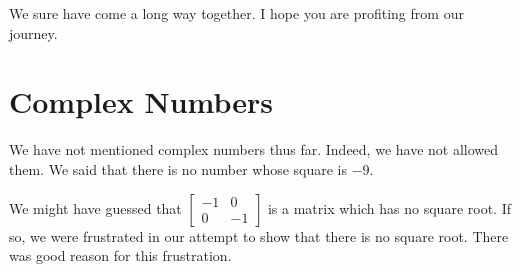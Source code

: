 \documentclass{article}
\begin{document}
We sure have come a long way together. I hope you are profiting from our journey.




\newpage

\section{Complex Numbers}

We have not mentioned complex numbers thus far. Indeed, we have not allowed them. We said that there is no number whose square is $-9$.

We might have guessed that $\begin{bmatrix} -1 & 0 \\ 0 & -1 \end{bmatrix}$ is a matrix which has no square root. If so, we were frustrated in our attempt to show that there is no square root. There was good reason for this frustration.
\end{document}
